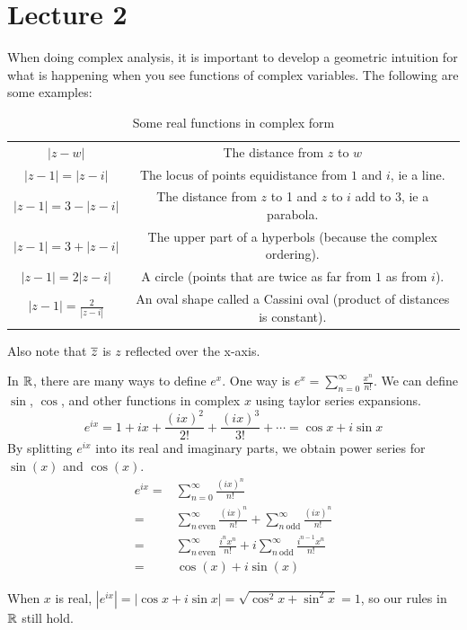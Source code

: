 \documentclass[11pt,leqno,oneside]{amsart}
\begin{document}
\section{Lecture 2}
When doing complex analysis, it is important to develop a geometric intuition
for what is happening when you see functions of complex variables. The
following are some examples:
\begin{table}
    \centering
    \begin{tabular}{|c|c|}
        \hline
        $|z-w|$ & The distance from $z$ to $w$ \\
        $|z-1|=|z-i|$ & The locus of points equidistance from $1$ and $i$, ie a line. \\
        $|z-1|=3-|z-i|$ & The distance from $z$ to 1 and $z$ to $i$ add to 3, ie a parabola. \\
        $|z-1|=3+|z-i|$ & The upper part of a hyperbols (because the complex ordering). \\
        $|z-1|=2|z-i|$ & A circle (points that are twice as far from $1$ as from $i$). \\
        $|z-1|=\frac{2}{|z-i|}$ & An oval shape called a Cassini oval (product of distances is constant). \\
        \hline
    \end{tabular}
    \caption{Some real functions in complex form}
    \label{tab:func-descs}
\end{table}
Also note that $\overline{z}$ is $z$ reflected over the x-axis.

In ${\mathbb R}$, there are many ways to define $e^x$. One way is $e^x =
\sum_{n=0}^\infty \frac{x^n}{n!}$. We can define $\sin$, $\cos$, and other functions in complex $x$ using taylor series expansions.
\[
    e^{ix} = 1 + ix + \frac{(ix)^2}{2!} + \frac{(ix)^3}{3!} + \cdots = \cos x + i \sin x
\]
By splitting $e^{ix}$ into its real and imaginary parts, we obtain power series for $\sin(x)$ and $\cos(x)$.
\begin{align}
  e^{ix} =& \sum_{n=0}^\infty \frac{(ix)^n}{n!}  \\
  =& \sum_{n\ \text{even}}^\infty \frac{(ix)^n}{n!} + \sum_{n\ \text{odd}}^\infty \frac{(ix)^n}{n!} \\
  =& \sum_{n\ \text{even}}^\infty \frac{i^n x^n}{n!} + i\sum_{n\ \text{odd}}^\infty \frac{i^{n-1} x^n}{n!} \\
  =& \cos(x) + i \sin(x)
\end{align}

When $x$ is real, $|e^{ix}| = |\cos x + i \sin x| = \sqrt{\cos^2 x + \sin^2 x}
= 1$, so our rules in ${\mathbb R}$ still hold.
\end{document}
